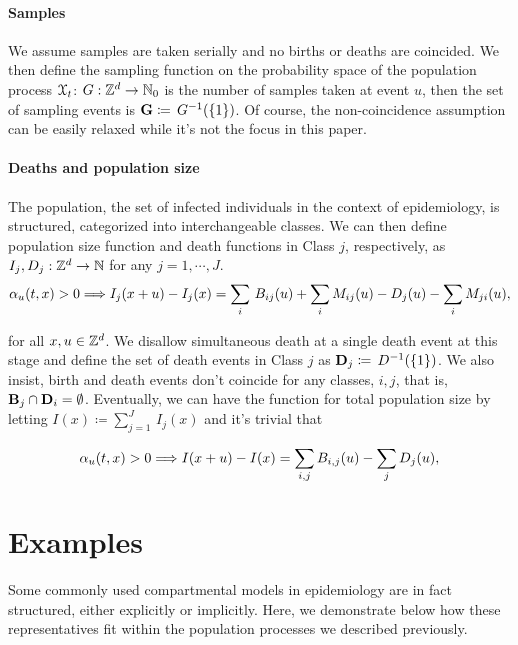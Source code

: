 \documentclass[11pt,reqno,final]{amsart}\usepackage[]{graphicx}\usepackage[]{color}
\begin{document}
\paragraph{Samples}
We assume samples are taken serially and no births or deaths are coincided. We then define the sampling function on the probability space of the population process $\mathcal{X}_t$: $G:\mathbb{Z}^d\to\mathbb{N}_0$ is the number of samples taken at event $u$, then the set of sampling events is $\mathbf{G}\coloneqq\,G^{-1}(\{1\})$. Of course, the non-coincidence assumption can be easily relaxed while it's not the focus in this paper.


\paragraph{Deaths and population size}
The population, the set of infected individuals in the context of epidemiology, is structured, categorized into interchangeable classes. We can then define population size function and death functions in Class $j$, respectively, as $I_{j}, D_{j}:\mathbb{Z}^d\to\mathbb{N}$ for any $j=1,\cdots,J$. 
\begin{equation}
  \alpha_u(t,x) > 0 \Longrightarrow I_j(x+u)-I_j(x)=\sum_{i}\,B_{ij}(u)+\sum_{i}M_{ij}(u)-D_j(u)-\sum_{i}M_{ji}(u),
\end{equation}

for all $x, u\in\mathbb{Z}^d$. We disallow simultaneous death at a single death event at this stage and define the set of death events in Class $j$ as $\mathbf{D}_j\coloneqq\,D^{-1}(\{1\})$. We also insist, birth and death events don't coincide for any classes, $i,j$, that is,  $\mathbf{B}_{j}\cap\mathbf{D}_{i}=\emptyset$. Eventually, we can have the function for total population size by letting $I(x)\coloneqq\sum_{j=1}^J\,I_j(x)$ and it's trivial that 

\begin{equation}
  \alpha_u(t,x) > 0 \Longrightarrow I(x+u)-I(x)=\sum_{i,j}B_{i,j}(u)-\sum_{j}D_j(u),
\end{equation}



\section{Examples}

Some commonly used compartmental models in epidemiology are in fact structured, either explicitly or implicitly. Here, we demonstrate below how these representatives fit within the population processes we described previously.
\end{document}
